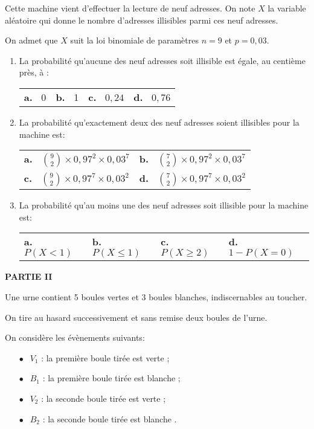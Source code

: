 \documentclass[10pt,a4paper,french]{article}
\begin{document}
Cette machine vient d'effectuer la lecture de neuf adresses. On note $X$ la variable aléatoire qui donne le nombre d'adresses illisibles parmi ces neuf adresses.

On admet que $X$ suit la loi binomiale de paramètres $n = 9$ et $p = 0,03$.

\medskip


\begin{enumerate}
\item La probabilité qu'aucune des neuf adresses soit illisible est égale, au centième près, à :
\begin{center}
\begin{tabularx}{\linewidth}{*{4}{X}}
\textbf{a.~} 0 &\textbf{b.~} 1 &\textbf{c.~} $0,24$ &\textbf{d.~} $0,76$
\end{tabularx}
\end{center}
\item  La probabilité qu'exactement deux des neuf adresses soient illisibles pour la machine est:
\begin{center}
\begin{tabularx}{\linewidth}{*{2}{X}}
\textbf{a.~} $\binom{9}{2} \times  0,97^2 \times 0,03^7$ &\textbf{b.~} $\binom{7}{2} \times  0,97^2 \times 0,03^7$\\
\textbf{c.~} $\binom{9}{2} \times 0,97^7 \times  0,03^2$ &\textbf{d.~} $\binom{7}{2} \times 0,97^7 \times 0,03^2$
\end{tabularx}
\end{center}
\item  La probabilité qu'au moins une des neuf adresses soit illisible pour la machine est:
\begin{center}
\begin{tabularx}{\linewidth}{*{4}{X}}
\textbf{a.~} $P(X < 1)$ &\textbf{b.~} $P(X \leqslant 1)$ &\textbf{c.~} $P(X \geqslant 2)$ &\textbf{d.~} $1- P(X = 0)$
\end{tabularx}
\end{center}
\end{enumerate}

\medskip

\textbf{PARTIE II}

\medskip

Une urne contient 5 boules vertes et 3 boules blanches, indiscernables au toucher.

On tire au hasard successivement et sans remise deux boules de l'urne.

On considère les évènements suivants:

\setlength\parindent{1cm}
\begin{itemize}
\item[$\bullet~~$] $V_1$ : \og la première boule tirée est verte \fg{} ;
\item[$\bullet~~$] $B_1$ : \og la première boule tirée est blanche \fg{} ;
\item[$\bullet~~$] $V_2$ : \og la seconde boule tirée est verte \fg{} ;
\item[$\bullet~~$] $B_2$ : \og la seconde boule tirée est blanche \fg.
\end{itemize}
\setlength\parindent{0cm}
\end{document}
